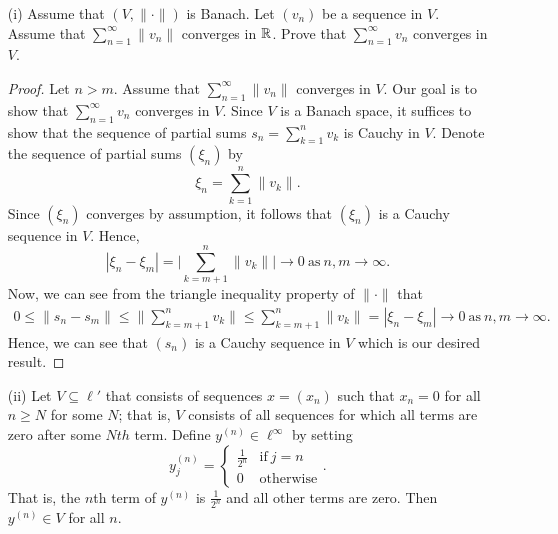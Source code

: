 \documentclass[a4paper]{article}
\begin{document}
\begin{enumerate}
    \item[(i)] Assume that \( (V, \|\cdot\|) \) is Banach. Let \( ({v}_{n}) \) be a sequence in \( V  \). Assume that \( \sum_{ n=1  }^{ \infty  } \|{v}_{n}\| \) converges in \( \mathbb{R}  \). Prove that \( \sum_{ n=1  }^{ \infty  }{v}_{n} \) converges in \( V  \). 
        \begin{proof}
            Let \( n > m  \). Assume that \( \sum_{ n=1  }^{ \infty  } \| {v}_{n} \| \) converges in \( V  \). Our goal is to show that \(  \sum_{ n=1  }^{ \infty   } {v}_{n} \)
            converges in \( V  \). Since \( V  \) is a Banach space, it suffices to show that the sequence of partial sums \( {s}_{n} = \sum_{ k=1  }^{ n } {v}_{k} \) is Cauchy in \( V  \). Denote the sequence of partial sums \( (\xi_n )  \) by
            \[  {\xi}_{n} = \sum_{ k=1  }^{ n } \|{v}_{k}\|. \]
            Since \( (\xi_n) \) converges by assumption, it follows that \( (\xi_n) \) is a Cauchy sequence in \( V  \). Hence, 
            \[  | \xi_n - \xi_m  | = \Big| \sum_{ k = m + 1  }^{ n  } \|{v}_{k}\| \Big| \to 0  \ \text{as} \ n,m \to \infty.  \]
        Now, we can see from the triangle inequality property of \( \|\cdot\|  \) that
        \begin{align*}
            0 \leq \| {s}_{n} - {s}_{m} \| \leq \Big\| \sum_{ k= m + 1  }^{ n } {v}_{k}\Big\| 
                                    \leq \sum_{ k= m + 1  }^{ n } \|{v}_{k }\| 
                                    = | {\xi}_{n} - {\xi}_{m} | \to 0 \ \text{as} \ n,m \to \infty.
        \end{align*}
        Hence, we can see that \( ({s}_{n}) \) is a Cauchy sequence in \( V  \) which is our desired result.
        \end{proof}
    \item[(ii)] Let \( V \subseteq  \ell' \) that consists of sequences \( x = ({x}_{n}) \) such that \( {x}_{n} = 0  \) for all \( n \geq N  \) for some \( N  \); that is, \( V  \) consists of all sequences for which all terms are zero after some \( Nth  \) term.
        Define \( y^{(n)} \in \ell^{\infty } \) by setting 
\[  {y}_{j}^{(n)} = 
\begin{cases}
    \frac{ 1 }{ 2^{n} }  &\text{if} \ j = n \\
    0 &\text{otherwise}
\end{cases}. \]
That is, the \( n \)th term of \( y^{(n)} \) is \( \frac{ 1 }{ 2^{n} }   \) and all other terms are zero. Then \( y^{(n)} \in V  \) for all \( n  \).


\end{enumerate}
\end{document}
